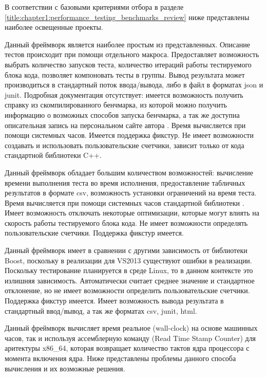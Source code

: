 В соответствии с базовыми критериями отбора в разделе \ref{title:chapter1:performance_testing_benchmarks_review} ниже представлены наиболее освещенные проекты.

\begin{description}[noitemsep]
	\item [Hayai \cite{hayai-repo}] Данный фреймворк является наиболее простым из представленных. Описание тестов происходит при помощи отдельного макроса. Предоставляет возможность выбрать количество запусков теста, количество итераций работы тестируемого блока кода, позволяет компоновать тесты в группы. Вывод результата может производиться в стандартный поток ввода/вывода, либо в файл в форматах json и junit. Подробная документация отсутствует: имеется возможность получить справку из скомпилированного бенчмарка, из которой можно получить информацию о возможных способов запуска бенчмарка, а так же доступна описательная запись на персональном сайте автора \cite{hayai-blog}. Время вычисляется при помощи системных часов. Имеется поддержка фикстур. Не имеет возможности создавать и использовать пользовательские счетчики, зависит только от кода стандартной библиотеки C++.
	\item [Celero \cite{celero-repo}] Данный фреймворк обладает большим количеством возможностей: вычисление времени выполнения теста во время исполнения, предоставление табличных результатов в формате csv, возможность установки ограничений на время теста. Время вычисляется при помощи системных часов стандартной библиотеки . Имеет возможность отключать некоторые оптимизации, которые могут влиять на скорость работы тестируемого блока кода. Не имеет возможности определять пользовательские счетчики. Поддержка фикстур имеется.
	\item [Nonius \cite{nonius-repo}] Данный фреймворк имеет в сравнении с другими зависимость от библиотеки Boost, поскольку в реализации  для VS2013 существуют ошибки в реализации. Поскольку тестирование планируется в среде Linux, то в данном контексте это излишняя зависимость. Автоматически считает среднее значение и стандартное отклонение, но не имеет возможности определить пользовательские счетчики. Поддержка фикстур имеется. Имеет возможность вывода результата в стандартный ввод/вывод, а так же форматах csv, junit, html.
	\item [Google benchmark \cite{google-benchmark-repo}] Данный фреймворк вычисляет время реальное (wall-clock) на основе машинных часов, так и используя ассемблерную команду  (Read Time Stamp Counter) для аритектуры x86\_64, которая возвращает количество тактов ядра процессора с момента включения ядра. Ниже представлены проблемы данного способа вычисления и их возможные решения.

\end{description}
